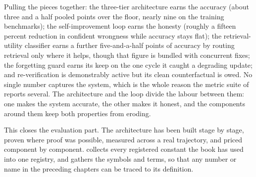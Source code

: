 \begin{bythenumbers}
Pulling the pieces together: the three-tier architecture earns the accuracy
(about three and a half pooled points over the floor, nearly nine on the training
benchmarks); the self-improvement loop earns the honesty (roughly a fifteen percent
reduction in confident wrongness while accuracy stays flat); the retrieval-utility
classifier earns a further five-and-a-half points of accuracy by routing retrieval only
where it helps, though that figure is bundled with concurrent fixes; the forgetting
guard earns its keep on the one cycle it caught a degrading update; and re-verification
is demonstrably active but its clean counterfactual is owed. No single number captures
the system, which is the whole reason the metric suite of  reports
several. The architecture and the loop divide the labour between them: one makes the
system accurate, the other makes it honest, and the components around them keep both
properties from eroding.
\end{bythenumbers}

This closes the evaluation part. The architecture has been built stage by stage,
proven where proof was possible, measured across a real trajectory, and priced
component by component.  collects every registered constant the book
has used into one registry, and  gathers the symbols and terms, so
that any number or name in the preceding chapters can be traced to its definition.
